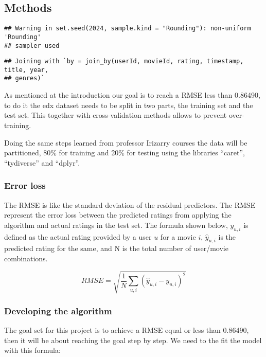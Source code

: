 \documentclass[
]{article}
\begin{document}
\hypertarget{methods}{%
\subsection{Methods}\label{methods}}

\begin{verbatim}
## Warning in set.seed(2024, sample.kind = "Rounding"): non-uniform 'Rounding'
## sampler used
\end{verbatim}

\begin{verbatim}
## Joining with `by = join_by(userId, movieId, rating, timestamp, title, year,
## genres)`
\end{verbatim}

As mentioned at the introduction our goal is to reach a RMSE less than
0.86490, to do it the edx dataset needs to be split in two parts, the
training set and the test set. This together with cross-validation
methods allows to prevent over-training.

Doing the same steps learned from professor Irizarry courses the data
will be partitioned, 80\% for training and 20\% for testing using the
libraries ``caret'', ``tydiverse'' and ``dplyr''.

\hypertarget{error-loss}{%
\subsubsection{Error loss}\label{error-loss}}

The RMSE is like the standard deviation of the residual predictors. The
RMSE represent the error loss between the predicted ratings from
applying the algorithm and actual ratings in the test set. The formula
shown below, \(y_{u,i}\) is defined as the actual rating provided by a
user \(u\) for a movie \(i\), \(\hat{y}_{u,i}\) is the predicted rating
for the same, and N is the total number of user/movie combinations.

\[RMSE = \sqrt{\frac{1}{N}\sum_{u,i}\left(\hat{y}_{u,i}-y_{u,i}\right)^2}\]

\hypertarget{developing-the-algorithm}{%
\subsubsection{Developing the
algorithm}\label{developing-the-algorithm}}

The goal set for this project is to achieve a RMSE equal or less than
0.86490, then it will be about reaching the goal step by step. We need
to the fit the model with this formula:
\end{document}
